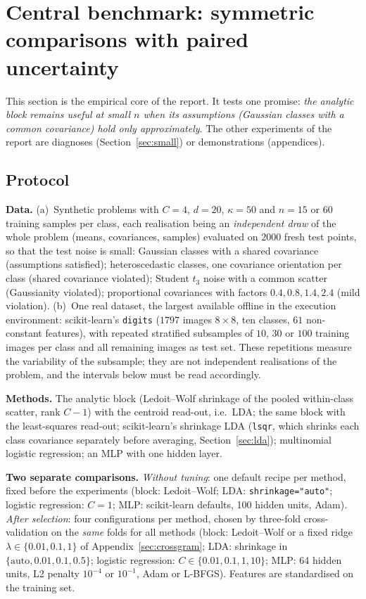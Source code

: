 \documentclass[11pt,a4paper]{article}
\theoremstyle{plain}
\theoremstyle{definition}
\theoremstyle{remark}
\begin{document}
\section{Central benchmark: symmetric comparisons with paired uncertainty}
\label{sec:central}
This section is the empirical core of the report. It tests one promise:
\emph{the analytic block remains useful at small $n$ when its assumptions
(Gaussian classes with a common covariance) hold only approximately}. The
other experiments of the report are diagnoses (Section~\ref{sec:small}) or
demonstrations (appendices).

\subsection{Protocol}
\textbf{Data.} (a)~Synthetic problems with $C=4$, $d=20$, $\kappa=50$ and
$n=15$ or $60$ training samples per class, each realisation being an
\emph{independent draw} of the whole problem (means, covariances, samples)
evaluated on $2000$ fresh test points, so that the test noise is small:
Gaussian classes with a shared covariance (assumptions satisfied);
heteroscedastic classes, one covariance orientation per class (shared
covariance violated); Student $t_3$ noise with a common scatter
(Gaussianity violated); proportional covariances with factors
$0.4,0.8,1.4,2.4$ (mild violation). (b)~One real dataset, the largest
available offline in the execution environment: scikit-learn's
\texttt{digits} ($1797$ images $8\times8$, ten classes, $61$ non-constant
features), with repeated stratified subsamples of $10$, $30$ or $100$
training images per class and all remaining images as test set. These
repetitions measure the variability of the subsample; they are not
independent realisations of the problem, and the intervals below must be
read accordingly.

\textbf{Methods.} The analytic block (Ledoit--Wolf shrinkage of the pooled
within-class scatter, rank $C-1$) with the centroid read-out, i.e.\ LDA; the
same block with the least-squares read-out; scikit-learn's shrinkage LDA
(\texttt{lsqr}, which shrinks each class covariance separately before
averaging, Section~\ref{sec:lda}); multinomial logistic
regression; an MLP with one hidden layer.

\textbf{Two separate comparisons.} \emph{Without tuning}: one default
recipe per method, fixed before the experiments (block: Ledoit--Wolf; LDA:
\texttt{shrinkage="auto"}; logistic regression: $C=1$; MLP: scikit-learn
defaults, 100 hidden units, Adam). \emph{After selection}: four
configurations per method, chosen by three-fold cross-validation on the
\emph{same} folds for all methods (block: Ledoit--Wolf or a fixed ridge
$\lambda\in\{0.01,0.1,1\}$ of Appendix~\ref{sec:crossgram}; LDA: shrinkage
in $\{\text{auto},0.01,0.1,0.5\}$; logistic regression:
$C\in\{0.01,0.1,1,10\}$; MLP: 64 hidden units, L2 penalty $10^{-4}$ or
$10^{-1}$, Adam or L-BFGS). Features are standardised on the training set.
\end{document}
